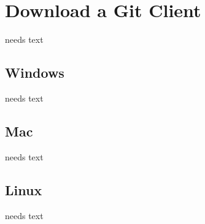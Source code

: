\documentclass[a4paper,10pt,twoside]{book}
\begin{document}
\section{Download a Git Client}
needs text

\subsection{Windows}
needs text

\subsection{Mac}
needs text

\subsection{Linux}
needs text


\ifx\wholebook\relax\else
   
   
\end{document}
